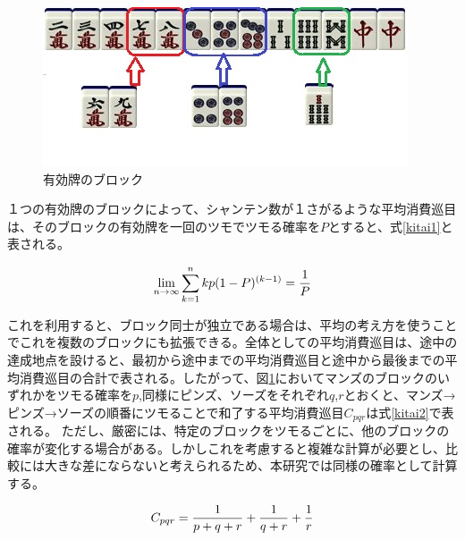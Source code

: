 \begin{figure}[h]
 \centering
 \includegraphics[keepaspectratio, scale=1,bb=0 0 320 194]
      {img/block.jpg}
 \caption{有効牌のブロック}
 \label{block}
\end{figure}

１つの有効牌のブロックによって、シャンテン数が１さがるような平均消費巡目は、そのブロックの有効牌を一回のツモでツモる確率を$P$とすると、式\ref{kitai1}と表される。\cite{gussan}

\begin{equation}
\label{kitai1}
\Large \lim _{n\rightarrow \infty }\sum _{k=1}^{n} { kp(1-P)^{(k-1)}} = \displaystyle \frac{1}{P}
\end{equation}

これを利用すると、ブロック同士が独立である場合は、平均の考え方を使うことでこれを複数のブロックにも拡張できる。全体としての平均消費巡目は、途中の達成地点を設けると、最初から途中までの平均消費巡目と途中から最後までの平均消費巡目の合計で表される。したがって、図\ref{block}においてマンズのブロックのいずれかをツモる確率を$p$,同様にピンズ、ソーズをそれぞれ$q$,$r$とおくと、マンズ→ピンズ→ソーズの順番にツモることで和了する平均消費巡目$C_{pqr}$は式\ref{kitai2}で表される。
ただし、厳密には、特定のブロックをツモるごとに、他のブロックの確率が変化する場合がある。しかしこれを考慮すると複雑な計算が必要とし、比較には大きな差にならないと考えられるため、本研究では同様の確率として計算する。

\begin{equation}
\label{kitai2}
\Large C_{pqr} = \displaystyle \frac{1}{p+q+r} + \displaystyle \frac{1}{q+r} + \displaystyle \frac{1}{r}
\end{equation}

